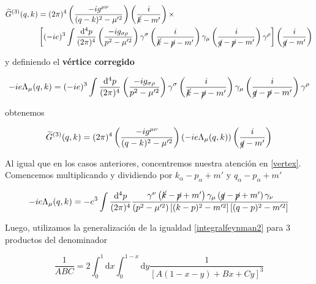 \documentclass{article}
\numberwithin{equation}{section}
\begin{document}
\begin{equation}\label{key}
\begin{aligned}
\widetilde{G}^{(3)}(q,k)&=(2\pi)^4 \left( \frac{-ig^{\mu\nu}}{(q-k)^2-\mu'^2} \right) \left( \frac{i}{\cancel{k}-m'} \right) \times\\
& \left[ (-ie)^3\int \frac{\mathrm{d^4}p}{(2\pi)^4} \left(\frac{-ig_{\sigma\rho}}{p^2-\mu'^2}\right) \gamma^{\sigma}\left(\frac{i}{\cancel{k}-\cancel{p}-m'}\right)\gamma_{\mu}\left(\frac{i}{\cancel{q}-\cancel{p} -m'}\right)\gamma^{\rho}  \right] \left(\frac{i}{\cancel{q}-m'}\right)
\end{aligned}
\end{equation}

y definiendo el \textbf{vértice corregido}

\begin{equation}\label{vertex}
-ie\Lambda_{\mu}(q,k)=(-ie)^3\int \frac{\mathrm{d^4}p}{(2\pi)^4} \left(\frac{-ig_{\sigma\rho}}{p^2-\mu'^2}\right) \gamma^{\sigma}\left(\frac{i}{\cancel{k}-\cancel{p}-m'}\right)\gamma_{\mu}\left(\frac{i}{\cancel{q}-\cancel{p} -m'}\right)\gamma^{\rho}
\end{equation}

obtenemos

\begin{equation}\label{key}
\widetilde{G}^{(3)}(q,k)=(2\pi)^4 \left(\frac{-ig^{\mu\nu}}{(q-k)^2-\mu'^2}\right) \left(-ie\Lambda_{\mu}(q,k)\right)\left(\frac{i}{\cancel{q}-m'}\right)
\end{equation}

Al igual que en los casos anteriores, concentremos nuestra atención en \ref{vertex}. Comencemos multiplicando y dividiendo por $ k_{\alpha}-p_{\alpha} +m' $ y $ q_{\alpha}-p_{\alpha} +m' $

\begin{equation}
-ie\Lambda_{\mu}(q,k)=-e^3\int \frac{\mathrm{d^4}p}{(2\pi)^4} \frac{  \gamma^{\nu}\left(\cancel{k}-\cancel{p} +m'\right)\gamma_{\mu}\left( \cancel{q}-\cancel{p} +m'\right)\gamma_{\nu}}{\left(p^2-\mu'^2\right)\left[(k-p)^2-m'^2\right]\left[(q-p)^2 -m'^2\right]}
\end{equation}

Luego, utilizamos la generalización de la igualdad \ref{integralfeynman2} para 3 productos del denominador

\begin{equation}\label{integralfeynman3}
\frac{1}{ABC}=2\int_0^1\mathrm{d}x\int_0^{1-x}\mathrm{d}y \frac{1}{\left[A(1-x-y)+Bx+Cy\right]^3}
\end{equation}
\end{document}
